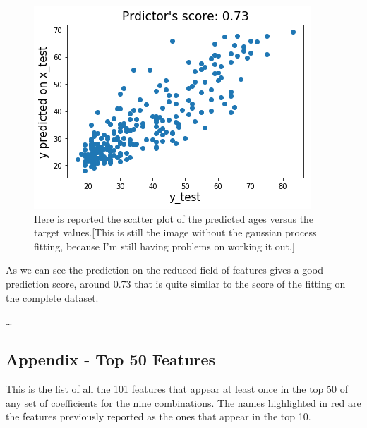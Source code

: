 \documentclass[11pt,a4paper]{report}
\begin{document}
\begin{figure}[H]
  \begin{center}
  \includegraphics[width=0.5\linewidth]{After_train_SVR.png}
  \caption{\small{Here is reported the scatter plot of the predicted ages versus the target values.[This is still the image without the gaussian process fitting, because I'm still having problems on working it out.]}}
  \label{fig:SVR_fit}
  \end{center}
\end{figure}

As we can see the prediction on the reduced field of features gives a good prediction score, around 0.73 that is quite similar to the score of the fitting on the complete dataset.

\dots


\subsection*{Appendix - Top 50 Features}
This is the list of all the 101 features that appear at least once in the top 50 of any set of coefficients for the nine combinations. The names highlighted in red are the features previously reported as the ones that appear in the top 10.
\end{document}
